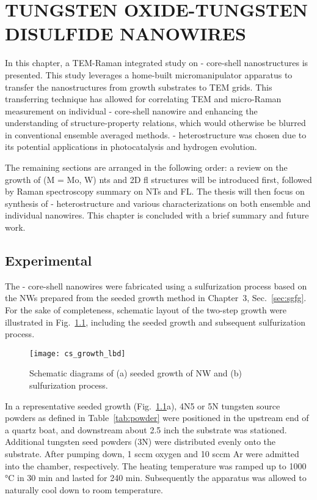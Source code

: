 \chapter{TUNGSTEN OXIDE-TUNGSTEN DISULFIDE NANOWIRES}

In this chapter, a TEM-Raman integrated study on - core-shell nanostructures is presented. This study leverages a home-built micromanipulator apparatus to transfer the nanostructures from growth substrates to TEM grids. This transferring technique has allowed for correlating TEM and micro-Raman measurement on individual - core-shell nanowire and enhancing the understanding of structure-property relations, which would otherwise be blurred in conventional ensemble averaged methods. - heterostructure was chosen due to its potential applications in photocatalysis and hydrogen evolution.\cite{DiPaola1999,Chen2011b} 

The remaining sections are arranged in the following order: a review on the growth of  (M = Mo, W) \glspl{nt} and 2D \gls{fl} structures will be introduced first, followed by Raman spectroscopy summary on  NTs and FL. The thesis will then focus on synthesis of - heterostructure and various characterizations on both ensemble and individual nanowires. This chapter is concluded with a brief summary and future work.



\section{Experimental}

The - core-shell nanowires were fabricated using a sulfurization process based on the  NWs prepared from the seeded growth method in Chapter~3, Sec.~\ref{sec:sgfg}. For the sake of completeness, schematic layout of the two-step growth were illustrated in Fig.~\ref{fig:ch5grow}, including the seeded growth and subsequent sulfurization process.
\begin{figure}[htb]
\centering
\texttt{[image: cs\_growth\_lbd]}
\caption[Schematic diagrams of seeded growth of  NW and sulfurization process]{Schematic diagrams of (a) seeded growth of  NW and (b) sulfurization process. }
\label{fig:ch5grow}
\end{figure}
In a representative seeded growth (Fig.~\ref{fig:ch5grow}a), 4N5 or 5N tungsten source powders as defined in Table~\ref{tab:powder} were positioned in the upstream end of a quartz boat, and downstream about 2.5 inch the substrate was stationed. Additional tungsten seed powders (3N) were distributed evenly onto the substrate. After pumping down, 1 sccm oxygen and 10 sccm Ar were admitted into the chamber, respectively. The heating temperature was ramped up to 1000 \si{\degreeCelsius} in 30 min and lasted for 240 min. Subsequently the apparatus was allowed to naturally cool down to room temperature. 

